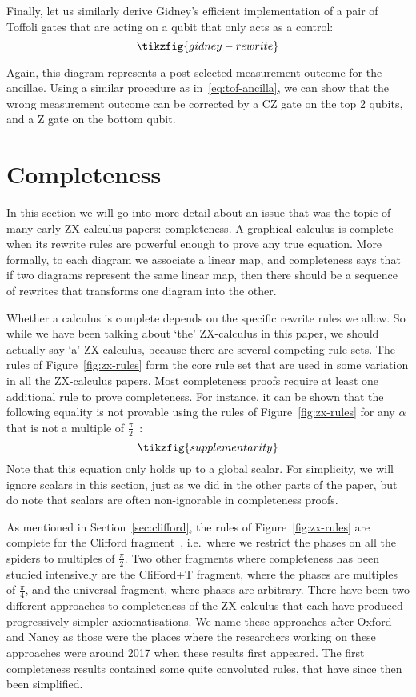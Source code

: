 \documentclass[a4paper,onecolumn,superscriptaddress,11pt,%
				unpublished,%
				allowfontchageintitle,%
				]{quantumarticle}
\begin{document}
Finally, let us similarly derive Gidney's efficient implementation of a pair of Toffoli gates that are acting on a qubit that only acts as a control:
\begin{equation}
	\tikzfig{gidney-rewrite}
\end{equation}

Again, this diagram represents a post-selected measurement outcome for the ancillae. Using a similar procedure as in~\eqref{eq:tof-ancilla}, we can show that the wrong measurement outcome can be corrected by a CZ gate on the top 2 qubits, and a Z gate on the bottom qubit.


\section{Completeness}\label{sec:completeness}

In this section we will go into more detail about an issue that was the topic of many early ZX-calculus papers: completeness.
A graphical calculus is complete when its rewrite rules are powerful enough to prove any true equation. More formally, to each diagram we associate a linear map, and completeness says that if two diagrams represent the same linear map, then there should be a sequence of rewrites that transforms one diagram into the other.

Whether a calculus is complete depends on the specific rewrite rules we allow. So while we have been talking about `the' ZX-calculus in this paper, we should actually say `a' ZX-calculus, because there are several competing rule sets. The rules of Figure~\ref{fig:zx-rules} form the core rule set that are used in some variation in all the ZX-calculus papers. Most completeness proofs require at least one additional rule to prove completeness. 
For instance, it can be shown that the following equality is not provable using the rules of Figure~\ref{fig:zx-rules} for any $\alpha$ that is not a multiple of $\frac\pi2$~\cite{supplementarity}:
\begin{equation}\label{eq:supplementarity}
	\tikzfig{supplementarity}
\end{equation}
Note that this equation only holds up to a global scalar. For simplicity, we will ignore scalars in this section, just as we did in the other parts of the paper, but do note that scalars are often non-ignorable in completeness proofs.

As mentioned in Section~\ref{sec:clifford}, the rules of Figure~\ref{fig:zx-rules} are complete for the Clifford fragment~\cite{BackensCompleteness}, i.e.~where we restrict the phases on all the spiders to multiples of $\frac\pi2$.
Two other fragments where completeness has been studied intensively are the Clifford+T fragment, where the phases are multiples of $\frac\pi4$, and the universal fragment, where phases are arbitrary.
There have been two different approaches to completeness of the ZX-calculus that each have produced progressively simpler axiomatisations. We name these approaches after Oxford and Nancy as those were the places where the researchers working on these approaches were around 2017 when these results first appeared. The first completeness results contained some quite convoluted rules, that have since then been simplified. 
\end{document}

